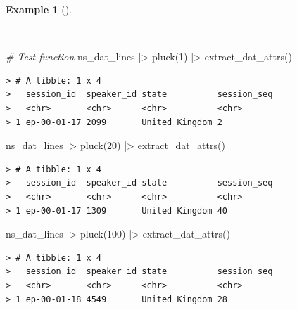 \documentclass[
  letterpaper,
]{latex/krantz}
\newenvironment{Shaded}{\begin{snugshade}}{\end{snugshade}}
\newcommand{\CommentTok}[1]{\textcolor[rgb]{0.00,0.00,0.00}{\textit{#1}}}
\newcommand{\DecValTok}[1]{\textcolor[rgb]{0.00,0.00,0.00}{#1}}
\newcommand{\FunctionTok}[1]{\textcolor[rgb]{0.00,0.00,0.00}{#1}}
\newcommand{\NormalTok}[1]{\textcolor[rgb]{0.00,0.00,0.00}{#1}}
\newcommand{\SpecialCharTok}[1]{\textcolor[rgb]{0.00,0.00,0.00}{#1}}
\theoremstyle{definition}
\newtheorem{example}{Example}[chapter]
\theoremstyle{remark}
\begin{document}
\begin{example}[]\protect\hypertarget{exm-cd-enntt-test-extract-attributes-function}{}\label{exm-cd-enntt-test-extract-attributes-function}

~

\begin{Shaded}
\begin{Highlighting}[]
\CommentTok{\# Test function}
\NormalTok{ns\_dat\_lines }\SpecialCharTok{|\textgreater{}} \FunctionTok{pluck}\NormalTok{(}\DecValTok{1}\NormalTok{) }\SpecialCharTok{|\textgreater{}} \FunctionTok{extract\_dat\_attrs}\NormalTok{()}
\end{Highlighting}
\end{Shaded}

\begin{verbatim}
> # A tibble: 1 x 4
>   session_id  speaker_id state          session_seq
>   <chr>       <chr>      <chr>          <chr>      
> 1 ep-00-01-17 2099       United Kingdom 2
\end{verbatim}

\begin{Shaded}
\begin{Highlighting}[]
\NormalTok{ns\_dat\_lines }\SpecialCharTok{|\textgreater{}} \FunctionTok{pluck}\NormalTok{(}\DecValTok{20}\NormalTok{) }\SpecialCharTok{|\textgreater{}} \FunctionTok{extract\_dat\_attrs}\NormalTok{()}
\end{Highlighting}
\end{Shaded}

\begin{verbatim}
> # A tibble: 1 x 4
>   session_id  speaker_id state          session_seq
>   <chr>       <chr>      <chr>          <chr>      
> 1 ep-00-01-17 1309       United Kingdom 40
\end{verbatim}

\begin{Shaded}
\begin{Highlighting}[]
\NormalTok{ns\_dat\_lines }\SpecialCharTok{|\textgreater{}} \FunctionTok{pluck}\NormalTok{(}\DecValTok{100}\NormalTok{) }\SpecialCharTok{|\textgreater{}} \FunctionTok{extract\_dat\_attrs}\NormalTok{()}
\end{Highlighting}
\end{Shaded}

\begin{verbatim}
> # A tibble: 1 x 4
>   session_id  speaker_id state          session_seq
>   <chr>       <chr>      <chr>          <chr>      
> 1 ep-00-01-18 4549       United Kingdom 28
\end{verbatim}

\end{example}
\end{document}
